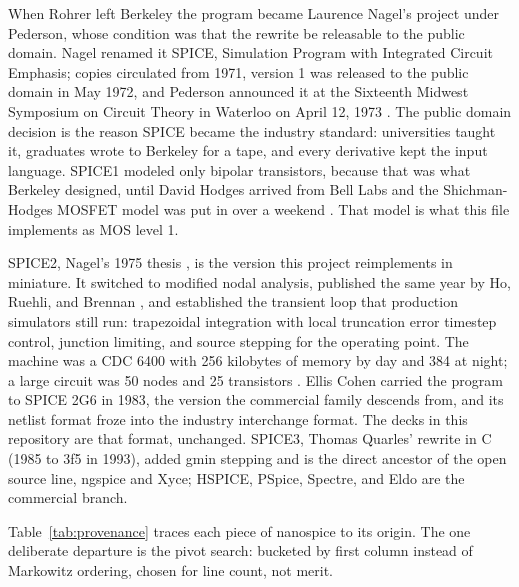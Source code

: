 \documentclass[11pt]{article}
\begin{document}
When Rohrer left Berkeley the program became Laurence Nagel's project
under Pederson, whose condition was that the rewrite be releasable to
the public domain. Nagel renamed it SPICE, Simulation Program with
Integrated Circuit Emphasis; copies circulated from 1971, version 1 was
released to the public domain in May 1972, and Pederson announced it at
the Sixteenth Midwest Symposium on Circuit Theory in Waterloo on April
12, 1973 \cite{spice1}. The public domain decision is the reason SPICE
became the industry standard: universities taught it, graduates wrote to
Berkeley for a tape, and every derivative kept the input language.
SPICE1 modeled only bipolar transistors, because that was what Berkeley
designed, until David Hodges arrived from Bell Labs and the
Shichman-Hodges MOSFET model \cite{shichman} was put in over a weekend
\cite{lifeofspice}. That model is what this file implements as MOS
level 1.

SPICE2, Nagel's 1975 thesis \cite{spice2}, is the version this project
reimplements in miniature. It switched to modified nodal analysis,
published the same year by Ho, Ruehli, and Brennan \cite{mna}, and
established the transient loop that production simulators still run:
trapezoidal integration with local truncation error timestep control,
junction limiting, and source stepping for the operating point. The
machine was a CDC 6400 with 256 kilobytes of memory by day and 384 at
night; a large circuit was 50 nodes and 25 transistors
\cite{lifeofspice}. Ellis Cohen carried the program to SPICE 2G6 in
1983, the version the commercial family descends from, and its netlist
format froze into the industry interchange format. The decks in this
repository are that format, unchanged. SPICE3, Thomas Quarles' rewrite
in C (1985 to 3f5 in 1993), added gmin stepping \cite{quarles} and is
the direct ancestor of the open source line, ngspice and Xyce; HSPICE,
PSpice, Spectre, and Eldo are the commercial branch.

Table~\ref{tab:provenance} traces each piece of nanospice to its origin.
The one deliberate departure is the pivot search: bucketed by first
column instead of Markowitz ordering, chosen for line count, not merit.
\end{document}
